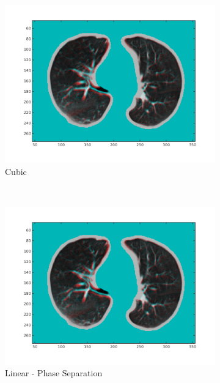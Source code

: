 \documentclass[11pt,a4paper,oneside]{report}
\begin{document}
\begin{figure}
\begin{subfigure}[b]{0.33\textwidth}
    \includegraphics[width=\textwidth, trim=0 50 0 0,clip=true]{figures/task4/visAss_m3.png}
    \caption{Cubic}
  \end{subfigure}
  ~
  \hspace*{-2em}
  \begin{subfigure}[b]{0.33\textwidth}
    \includegraphics[width=\textwidth, trim=0 50 0 0,clip=true]{figures/task4/visAss_m4.png}
    \caption{Linear - Phase Separation}
  \end{subfigure}%
  \begin{subfigure}[b]{0.33\textwidth}

\end{subfigure}
\end{figure}
\end{document}

